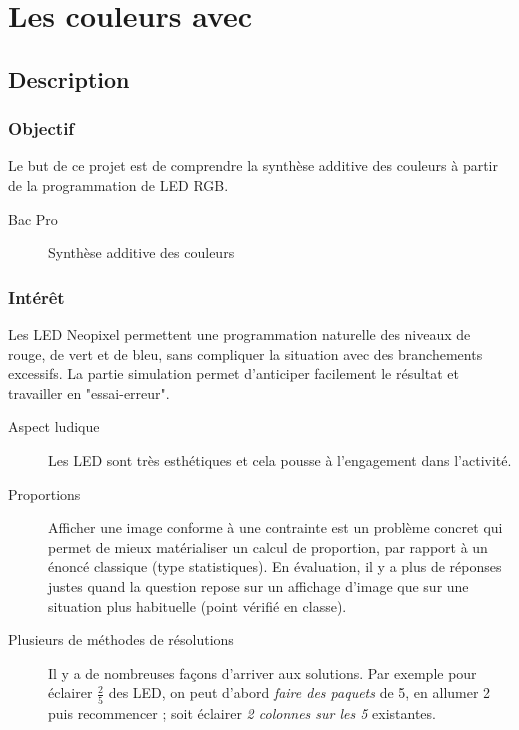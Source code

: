 \section{Les couleurs avec \mb}


\pagestyle{mb}

\subsection{Description}

\subsubsection{Objectif}

\begin{formule}
Le but de ce projet est de comprendre la synthèse additive des couleurs à partir de la programmation de LED RGB.
\end{formule}

\begin{description}
    \item [Bac Pro] 
        Synthèse additive des couleurs\\
       
    
\end{description}


\subsubsection{Intérêt}
Les LED Neopixel permettent une programmation naturelle des niveaux de rouge, de vert et de bleu, sans compliquer la situation avec des branchements excessifs. La partie simulation permet d'anticiper facilement le résultat et travailler en "essai-erreur".    

\begin{description}
    \item [Aspect ludique] Les LED sont très esthétiques et cela pousse à l'engagement dans l'activité. 
    \item [Proportions] Afficher une image conforme à une contrainte est un problème concret qui permet de mieux matérialiser un calcul de proportion, par rapport à un énoncé classique (type statistiques). En évaluation, il y a plus de réponses justes quand la question repose sur un affichage d'image que sur une situation plus habituelle (point vérifié en classe).
    \item [Plusieurs de méthodes de résolutions] Il y a de nombreuses façons d'arriver aux solutions. Par exemple pour éclairer $\frac{2}{5}$ des LED, on peut d'abord \emph{faire des paquets} de 5, en allumer 2 puis recommencer ; soit éclairer \emph{2 colonnes sur les 5} existantes.
\end{description}


